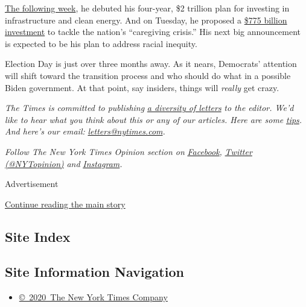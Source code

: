 \href{https://www.nytimes.com/2020/07/14/us/politics/biden-climate-plan.html}{The
following week}, he debuted his four-year, \$2 trillion plan for
investing in infrastructure and clean energy. And on Tuesday, he
proposed a
\href{https://www.nytimes.com/2020/07/21/us/politics/biden-workplace-childcare.html}{\$775
billion investment} to tackle the nation's ``caregiving crisis.'' His
next big announcement is expected to be his plan to address racial
inequity.

Election Day is just over three months away. As it nears, Democrats'
attention will shift toward the transition process and who should do
what in a possible Biden government. At that point, say insiders, things
will \emph{really} get crazy.

\emph{The Times is committed to publishing}
\href{https://www.nytimes.com/2019/01/31/opinion/letters/letters-to-editor-new-york-times-women.html}{\emph{a
diversity of letters}} \emph{to the editor. We'd like to hear what you
think about this or any of our articles. Here are some}
\href{https://help.nytimes.com/hc/en-us/articles/115014925288-How-to-submit-a-letter-to-the-editor}{\emph{tips}}\emph{.
And here's our email:}
\href{mailto:letters@nytimes.com}{\emph{letters@nytimes.com}}\emph{.}

\emph{Follow The New York Times Opinion section on}
\href{https://www.facebook.com/nytopinion}{\emph{Facebook}}\emph{,}
\href{http://twitter.com/NYTOpinion}{\emph{Twitter (@NYTopinion)}}
\emph{and}
\href{https://www.instagram.com/nytopinion/}{\emph{Instagram}}\emph{.}

Advertisement

\protect\hyperlink{after-bottom}{Continue reading the main story}

\hypertarget{site-index}{%
\subsection{Site Index}\label{site-index}}

\hypertarget{site-information-navigation}{%
\subsection{Site Information
Navigation}\label{site-information-navigation}}

\begin{itemize}
\tightlist
\item
  \href{https://help.nytimes.com/hc/en-us/articles/115014792127-Copyright-notice}{©~2020~The
  New York Times Company}
\end{itemize}

